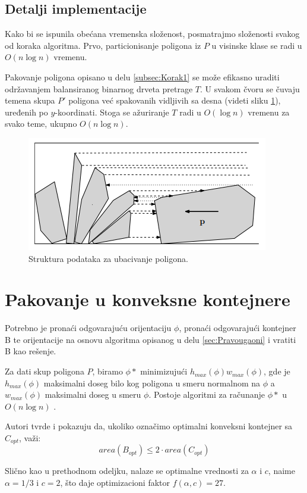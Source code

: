 \documentclass[a4paper]{article}
\theoremstyle{plain}
\theoremstyle{definition}
\begin{document}
\subsection{Detalji implementacije}
\label{subsec:Implementacija}

Kako bi se ispunila obe\'c{}ana vremenska slo\v{z}enost, posmatrajmo slo\v{z}enosti svakog od koraka algoritma. Prvo, particionisanje poligona iz $P$ u visinske klase se radi u $O(n\log{}n)$ vremenu.

Pakovanje poligona opisano u delu \ref{subsec:Korak1} se mo\v{z}e efikasno uraditi odr\v{z}avanjem balansiranog binarnog drveta pretrage $T$. U svakom \v{c}voru se \v{c}uvaju temena skupa $P'$ poligona ve\'c{} spakovanih vidljivih sa desna (videti sliku \ref{fig2}), uređenih po $y$-koordinati. Stoga se a\v{z}uriranje $T$ radi u $O(\log{}n)$ vremenu za svako teme, ukupno $O(n\log{}n)$. 

\begin{figure}[H]
    \centering
    \includegraphics[scale=0.5]{resources/fig2.PNG}
    \caption{Struktura podataka za ubacivanje poligona.}
    \label{fig2}
\end{figure}


\section{Pakovanje u konveksne kontejnere}
\label{sec:Konveksni}

Potrebno je prona\'c{}i odgovaraju\'c{}u orijentaciju $\phi$, prona\'c{}i odgovaraju\'c{}i kontejner B te orijentacije na osnovu algoritma opisanog u delu \ref{sec:Pravougaoni} i vratiti B kao re\v{s}enje.

Za dati skup poligona $P$, biramo $\phi*$  minimizuju\'c{}i $h_{max}(\phi)w_{max}(\phi)$, gde je $h_{max}(\phi)$ maksimalni doseg bilo kog poligona u smeru normalnom na $\phi$ a $w_{max}(\phi)$ maksimalni doseg u smeru $\phi$. Postoje algoritmi za ra\v{c}unanje $\phi*$ u $O(n\log{}n)$ \cite{BuildingThreeConvexPolygons}.

Autori tvrde i pokazuju da, ukoliko ozna\v{c}imo optimalni konveksni kontejner sa $C_{opt}$, va\v{z}i: $$area(B_{opt}) \leq 2 \cdot area(C_{opt})$$

Sli\v{c}no kao u prethodnom odeljku, nalaze se optimalne vrednosti za $\alpha$ i $c$, naime $\alpha = 1/3$ i $c = 2$, \v{s}to daje optimizacioni faktor $f(\alpha, c) = 27$.


\appendix



\end{document}
